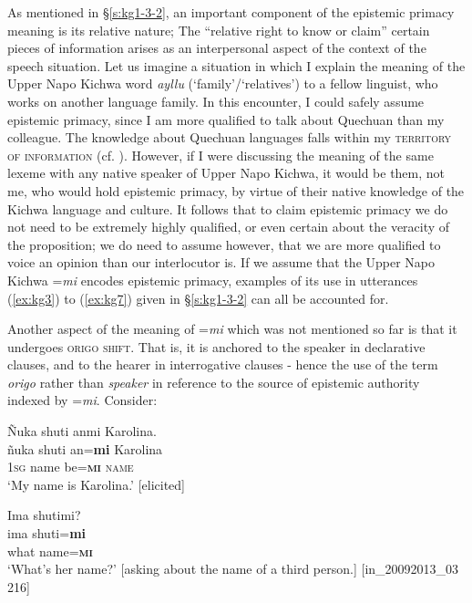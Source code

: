 \documentclass[output=paper]{langscibook}
\begin{document}
As mentioned in §\ref{s:kg1-3-2}, an important component of the epistemic primacy meaning is its relative nature; The “relative right to know or claim” certain pieces of information arises as an interpersonal aspect of the context of the speech situation. Let us imagine a situation in which I explain the meaning of the Upper Napo Kichwa word \textit{ayllu} (‘family’/‘relatives’) to a fellow linguist, who works on another language family. In this encounter, I could safely assume epistemic primacy, since I am more qualified to talk about Quechuan than my colleague. The knowledge about Quechuan languages falls within my \textsc{territory of information} (cf. \citealt{Kamio1997}). However, if I were discussing the meaning of the same lexeme with any native speaker of Upper Napo Kichwa, it would be them, not me, who would hold epistemic primacy, by virtue of their native knowledge of the Kichwa language and culture. It follows that to claim epistemic primacy we do not need to be extremely highly qualified, or even certain about the veracity of the proposition; we do need to assume however, that we are more qualified to voice an opinion than our interlocutor is. If we assume that the Upper Napo Kichwa =\textit{mi} encodes epistemic primacy, examples of its use in utterances ‎(\ref{ex:kg3}) to ‎(\ref{ex:kg7}) given in §‎\ref{s:kg1-3-2} can all be accounted for. 

Another aspect of the meaning of =\textit{mi} which was not mentioned so far is that it undergoes \textsc{origo shift}. That is, it is anchored to the speaker in declarative clauses, and to the hearer in interrogative clauses - hence the use of the term \emph{origo} rather than \emph{speaker} in reference to the source of epistemic authority indexed by =\textit{mi}.  Consider:

\begin{exe}
	\ex \label{ex:kg11}
	\glll Ñuka shuti anmi Karolina.\\
	ñuka shuti an=\textbf{mi} Karolina\\
	1\textsc{sg}	 name be=\textbf{\textsc{mi}} \textsc{name}\\
	\trans ‘My name is Karolina.’ [elicited]
\end{exe}

\begin{exe}
	\ex \label{ex:kg12}
	\glll Ima shutimi?\\
	ima	shuti=\textbf{mi}\\
	what	 name=\textbf{\textsc{mi}}\\
	\trans ‘What’s her name?’ [asking about the name of a third person.] [in\_20092013\_03   216] %
\end{exe}
\end{document}
